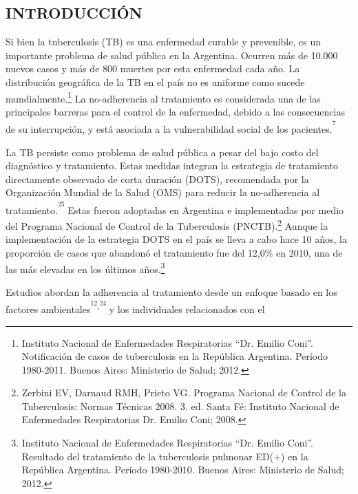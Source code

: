 \begin{multicols}{2}
\section*{INTRODUCCIÓN}
\par{}Si bien la tuberculosis (\allowbreak{}TB)\allowbreak{} es una enfermedad curable y prevenible,\allowbreak{} es un importante problema de salud pública en la Argentina.\allowbreak{} Ocurren más de 10.\allowbreak{}000 nuevos casos y más de 800 muertes por esta enfermedad cada año.\allowbreak{} La distribución geográfica de la TB en el país no es uniforme como sucede mundialmente.\allowbreak{}\protect\footnote{ Instituto Nacional de Enfermedades Respiratorias “Dr.\allowbreak{} Emilio Coni”.\allowbreak{} Notificación de casos de tuberculosis en la República Argentina.\allowbreak{} Período 1980-\allowbreak{}2011.\allowbreak{} Buenos Aires:\allowbreak{} Ministerio de Salud; 2012.\allowbreak{}} La no-\allowbreak{}adherencia al tratamiento es considerada una de las principales barreras para el control de la enfermedad,\allowbreak{} debido a las consecuencias de su interrupción,\allowbreak{} y está asociada a la vulnerabilidad social de los pacientes.\allowbreak{}\textsuperscript{\textsuperscript{7}}\par{}La TB persiste como problema de salud pública a pesar del bajo costo del diagnóstico y tratamiento.\allowbreak{} Estas medidas integran la estrategia de tratamiento directamente observado de corta duración (\allowbreak{}DOTS)\allowbreak{},\allowbreak{} recomendada por la Organización Mundial de la Salud (\allowbreak{}OMS)\allowbreak{} para reducir la no-\allowbreak{}adherencia al tratamiento.\allowbreak{}\textsuperscript{\textsuperscript{25}} Estas fueron adoptadas en Argentina e implementadas por medio del Programa Nacional de Control de la Tuberculosis (\allowbreak{}PNCTB)\allowbreak{}.\allowbreak{}\protect\footnote{ Zerbini EV,\allowbreak{} Darnaud RMH,\allowbreak{} Prieto VG.\allowbreak{} Programa Nacional de Control de la Tuberculosis:\allowbreak{} Normas Técnicas 2008.\allowbreak{} 3.\allowbreak{} ed.\allowbreak{} Santa Fé:\allowbreak{} Instituto Nacional de Enfermedades Respiratorias Dr.\allowbreak{} Emilio Coni; 2008.\allowbreak{}} Aunque la implementación de la estrategia DOTS en el país se lleva a cabo hace 10 años,\allowbreak{} la proporción de casos que abandonó el tratamiento fue del 12,\allowbreak{}0\%\allowbreak{\allowbreak{}\allowbreak{}}\allowbreak{} en 2010,\allowbreak{} una de las más elevadas en los últimos años.\allowbreak{}\protect\footnote{ Instituto Nacional de Enfermedades Respiratorias “Dr.\allowbreak{} Emilio Coni”.\allowbreak{} Resultado del tratamiento de la tuberculosis pulmonar ED(\allowbreak{}+\allowbreak{})\allowbreak{} en la República Argentina.\allowbreak{} Período 1980-\allowbreak{}2010.\allowbreak{} Buenos Aires:\allowbreak{} Ministerio de Salud; 2012.\allowbreak{}}\par{}Estudios abordan la adherencia al tratamiento desde un enfoque basado en los factores ambientales\textsuperscript{\textsuperscript{12}}\textsuperscript{,\allowbreak{}}\textsuperscript{\textsuperscript{24}} y los individuales relacionados con el 
\end{multicols}
